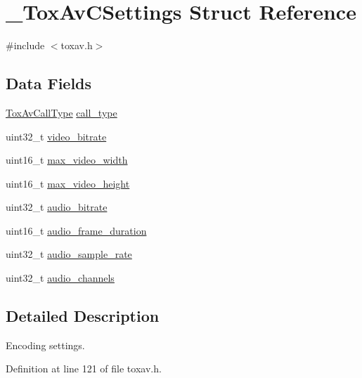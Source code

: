 \hypertarget{struct___tox_av_c_settings}{\section{\+\_\+\+Tox\+Av\+C\+Settings Struct Reference}
\label{struct___tox_av_c_settings}
}


{\ttfamily \#include $<$toxav.\+h$>$}

\subsection*{Data Fields}
\begin{DoxyCompactItemize}
\item 
\hyperlink{toxav_8h_aa735e8f3c71af6a841c2ffc3650bb802}{Tox\+Av\+Call\+Type} \hyperlink{struct___tox_av_c_settings_af8142c751283bdc9d14609ab3009b920}{call\+\_\+type}
\item 
uint32\+\_\+t \hyperlink{struct___tox_av_c_settings_af0eac99d4181795e8a595d244e745192}{video\+\_\+bitrate}
\item 
uint16\+\_\+t \hyperlink{struct___tox_av_c_settings_ab81ecded1f7c46e120c8f2afa7b2c5cc}{max\+\_\+video\+\_\+width}
\item 
uint16\+\_\+t \hyperlink{struct___tox_av_c_settings_a4fef4b2fa1a8ae8446314ad0af4ce698}{max\+\_\+video\+\_\+height}
\item 
uint32\+\_\+t \hyperlink{struct___tox_av_c_settings_a5d9a8b59b2eb1eef8dbdcb032bf1dd01}{audio\+\_\+bitrate}
\item 
uint16\+\_\+t \hyperlink{struct___tox_av_c_settings_a61b592233f5a65705eb2600d38e365cd}{audio\+\_\+frame\+\_\+duration}
\item 
uint32\+\_\+t \hyperlink{struct___tox_av_c_settings_a66da4482e934a2700e07a39fa0838559}{audio\+\_\+sample\+\_\+rate}
\item 
uint32\+\_\+t \hyperlink{struct___tox_av_c_settings_a1b04e9669a2929f425e867440b6d826d}{audio\+\_\+channels}
\end{DoxyCompactItemize}


\subsection{Detailed Description}
Encoding settings. 

Definition at line 121 of file toxav.\+h.



